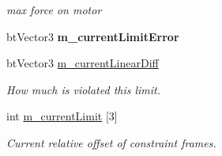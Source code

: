 \begin{DoxyCompactItemize}
\begin{DoxyCompactList}\small\item\em max force on motor \end{DoxyCompactList}\item 
\hypertarget{classbt_translational_limit_motor_a92e72a7a72546204270e5949e5e78530}{bt\+Vector3 {\bfseries m\+\_\+current\+Limit\+Error}}\label{classbt_translational_limit_motor_a92e72a7a72546204270e5949e5e78530}

\item 
\hypertarget{classbt_translational_limit_motor_a82c7d9119513981d0bafae04e928b6d2}{bt\+Vector3 \hyperlink{classbt_translational_limit_motor_a82c7d9119513981d0bafae04e928b6d2}{m\+\_\+current\+Linear\+Diff}}\label{classbt_translational_limit_motor_a82c7d9119513981d0bafae04e928b6d2}

\begin{DoxyCompactList}\small\item\em How much is violated this limit. \end{DoxyCompactList}\item 
int \hyperlink{classbt_translational_limit_motor_a10c82797a218fd20026256f9e69b9b62}{m\+\_\+current\+Limit} \mbox{[}3\mbox{]}
\begin{DoxyCompactList}\small\item\em Current relative offset of constraint frames. \end{DoxyCompactList}\end{DoxyCompactItemize}
{\bf }\par
